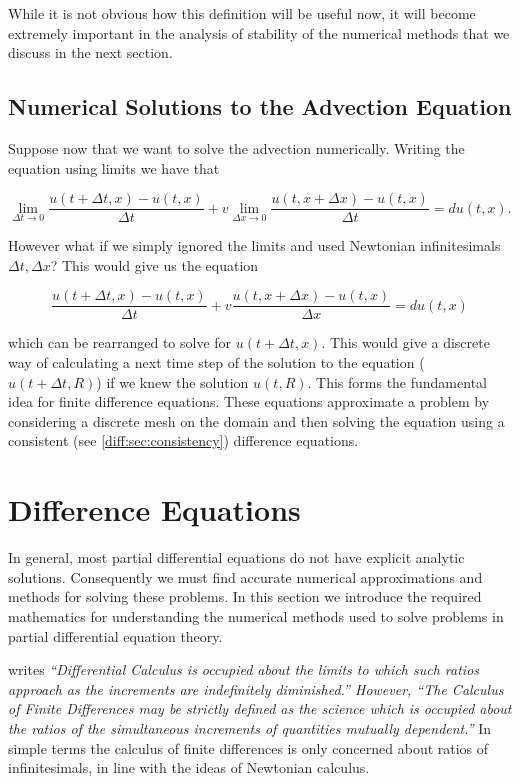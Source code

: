 \documentclass[../main.tex]{subfiles}
\begin{document}
  While it is not obvious how this definition will be useful now, it will become extremely important in the analysis of stability of the numerical methods that we discuss in the next section.

  \subsection{Numerical Solutions to the Advection Equation} \label{diff:sec:fdesintro}
  Suppose now that we want to solve the advection numerically. Writing the equation using limits we have that

  \begin{equation} \label{diff:eq:finiteadvection}
    \lim_{\Delta t \to 0} \frac{u(t + \Delta t, x) - u(t, x)}{\Delta t} + v \lim_{\Delta x \to 0} \frac{u(t, x + \Delta x) - u(t, x)}{\Delta t} = d u(t, x).
  \end{equation}

  However what if we simply ignored the limits and used Newtonian infinitesimals $\Delta t, \Delta x$? This would give us the equation

  \begin{equation} \label{diff:eq:advectionfde}
    \frac{u(t + \Delta t, x) - u(t, x)}{\Delta t} + v \frac{u(t, x + \Delta x) - u(t, x)}{\Delta x} = d u(t, x)
  \end{equation}

  which can be rearranged to solve for $u(t + \Delta t, x)$. This would give a discrete way of calculating a next time step  of the solution to the equation ($u(t + \Delta t, R)$) if we knew the solution $u(t, R)$. This forms the fundamental idea for finite difference equations. These equations approximate a problem by considering a discrete mesh on the domain and then solving the equation using a consistent (see \autoref{diff:sec:consistency}) difference equations.

  \section{Difference Equations}
  In general, most partial differential equations do not have explicit analytic solutions. Consequently we must find accurate numerical approximations and methods for solving these problems. In this section we introduce the required mathematics for understanding the numerical methods used to solve problems in partial differential equation theory.

  \cite{boole1880} writes \emph{``Differential Calculus is occupied about the limits to which such ratios approach as the increments are indefinitely diminished.'' However, ``The Calculus of Finite Differences may be strictly defined as the science which is occupied about the ratios of the simultaneous increments of quantities mutually dependent.''} In simple terms the calculus of finite differences is only concerned about ratios of infinitesimals, in line with the ideas of Newtonian calculus.
\end{document}
